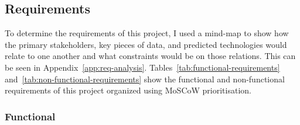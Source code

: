 
\subsection{Requirements}
\label{subsec:requirements}

To determine the requirements of this project, I used a mind-map to show how the primary stakeholders, key pieces of data, and predicted technologies would relate to one another and what constraints would be on those relations. This can be seen in Appendix~\ref{app:req-analysis}.
\x
Tables~\ref{tab:functional-requirements} and~\ref{tab:non-functional-requirements} show the functional and non-functional requirements of this project organized using MoSCoW prioritisation.

\subsubsection*{Functional}

